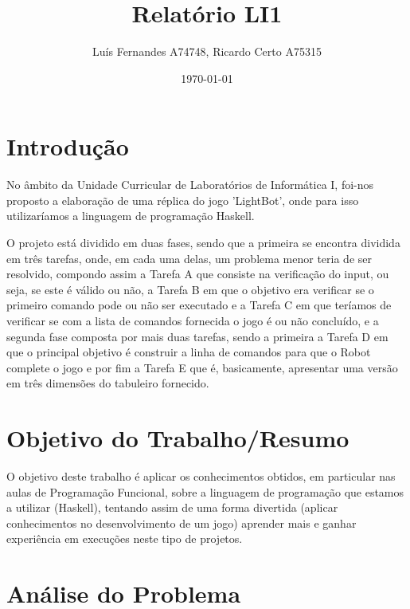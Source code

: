 \documentclass[a4paper, 12pt, portuguese]{article}
\title{Relatório LI1}
\author{Luís Fernandes A74748, Ricardo Certo A75315}
\date{\today}
\begin{document}
\maketitle

\tableofcontents

\section{Introdução}

No âmbito da Unidade Curricular de Laboratórios de Informática I, foi-nos proposto a elaboração de uma réplica do jogo 'LightBot', onde para isso utilizaríamos a linguagem de programação Haskell.

O projeto está dividido em duas fases, sendo que a primeira se encontra dividida em três tarefas, onde, em cada uma delas, um problema menor teria de ser resolvido, compondo assim a Tarefa A que consiste na verificação do input, ou seja, se este é válido ou não, a Tarefa B em que o objetivo era verificar se o primeiro comando pode ou não ser executado e a Tarefa C em que teríamos de verificar se com a lista de comandos fornecida o jogo é ou não concluído, e a segunda fase composta por mais duas tarefas, sendo a primeira a Tarefa D em que o principal objetivo é construir a linha de comandos para que o Robot complete o jogo e por fim a Tarefa E que é, basicamente, apresentar uma versão em três dimensões do tabuleiro fornecido. 

\section{Objetivo do Trabalho/Resumo}

O objetivo deste trabalho é aplicar os conhecimentos obtidos, em particular nas aulas de Programação Funcional, sobre a linguagem de programação que estamos a utilizar (Haskell), tentando assim de uma forma divertida (aplicar conhecimentos no desenvolvimento de um jogo) aprender mais e ganhar experiência em execuções neste tipo de projetos.

\section{Análise do Problema}
\end{document}
